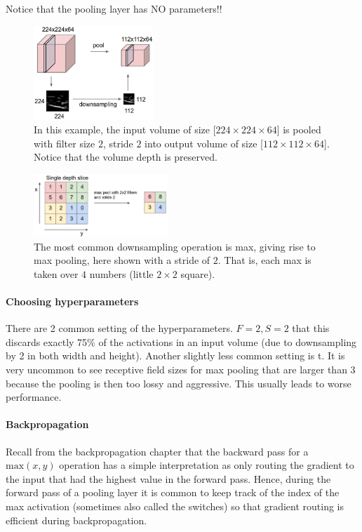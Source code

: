 Notice that the pooling layer has NO parameters!!

\begin{figure}[h]
  \centering
  \includegraphics[width=0.4\textwidth]{Images/pool_layer/1.png}
  \caption{ In this example, the input volume of size [$224 \times 224 \times 64$] is pooled with filter size $2$, stride $2$ into output volume of size [$112 \times 112 \times 64$]. Notice that the volume depth is preserved.}
\end{figure}

\begin{figure}[h]
  \centering
  \includegraphics[width=0.45\textwidth]{Images/pool_layer/2.png}
  \caption{The most common downsampling operation is max, giving rise to max pooling, here shown with a stride of $2$. That is, each max is taken over $4$ numbers (little $2 \times 2$ square).}
\end{figure}



\paragraph*{Choosing hyperparameters} There are 2 common setting of the hyperparameters. $F=2, S=2$ that this discards exactly 75\% of the activations in an input volume (due to downsampling by 2 in both width and height). Another slightly less common setting is t. It is very uncommon to see receptive field sizes for max pooling that are larger than 3 because the pooling is then too lossy and aggressive. This usually leads to worse performance.

\paragraph*{Backpropagation} Recall from the backpropagation chapter that the backward pass for a $\text{max}(x, y)$ operation has a simple interpretation as only routing the gradient to the input that had the highest value in the forward pass. Hence, during the forward pass of a pooling layer it is common to keep track of the index of the max activation (sometimes also called the switches) so that gradient routing is efficient during backpropagation.


